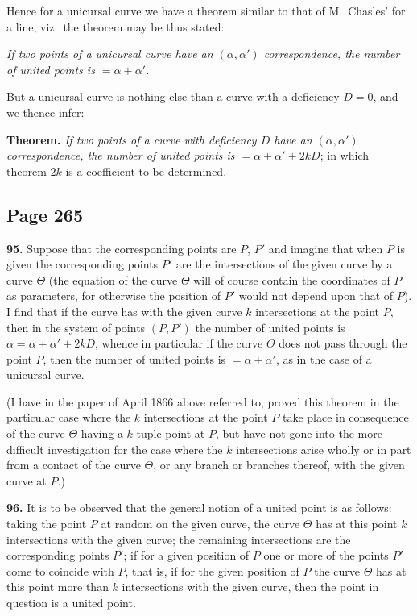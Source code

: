 \documentclass[11pt,a4paper]{article}
\theoremstyle{definition}
\begin{document}
Hence for a unicursal curve we have a theorem similar to that of M.\ Chasles' for a line, viz.\ the theorem may be thus stated:

\textit{If two points of a unicursal curve have an $(\alpha, \alpha')$ correspondence, the number of united points is $= \alpha + \alpha'$.}

But a unicursal curve is nothing else than a curve with a deficiency $D = 0$, and we thence infer:

\smallskip
\noindent\textbf{Theorem.} \textit{If two points of a curve with deficiency $D$ have an $(\alpha, \alpha')$ correspondence, the number of united points is $= \alpha + \alpha' + 2kD$}; in which theorem $2k$ is a coefficient to be determined.

\subsection*{Page 265}

\noindent\textbf{95.} Suppose that the corresponding points are $P$, $P'$ and imagine that when $P$ is given the corresponding points $P'$ are the intersections of the given curve by a curve $\Theta$ (the equation of the curve $\Theta$ will of course contain the coordinates of $P$ as parameters, for otherwise the position of $P'$ would not depend upon that of $P$). I find that if the curve has with the given curve $k$ intersections at the point $P$, then in the system of points $(P, P')$ the number of united points is $\alpha = \alpha + \alpha' + 2kD$, whence in particular if the curve $\Theta$ does not pass through the point $P$, then the number of united points is $= \alpha + \alpha'$, as in the case of a unicursal curve.

(I have in the paper of April 1866 above referred to, proved this theorem in the particular case where the $k$ intersections at the point $P$ take place in consequence of the curve $\Theta$ having a $k$-tuple point at $P$, but have not gone into the more difficult investigation for the case where the $k$ intersections arise wholly or in part from a contact of the curve $\Theta$, or any branch or branches thereof, with the given curve at $P$.)

\noindent\textbf{96.} It is to be observed that the general notion of a united point is as follows: taking the point $P$ at random on the given curve, the curve $\Theta$ has at this point $k$ intersections with the given curve; the remaining intersections are the corresponding points $P'$; if for a given position of $P$ one or more of the points $P'$ come to coincide with $P$, that is, if for the given position of $P$ the curve $\Theta$ has at this point more than $k$ intersections with the given curve, then the point in question is a united point.
\end{document}
